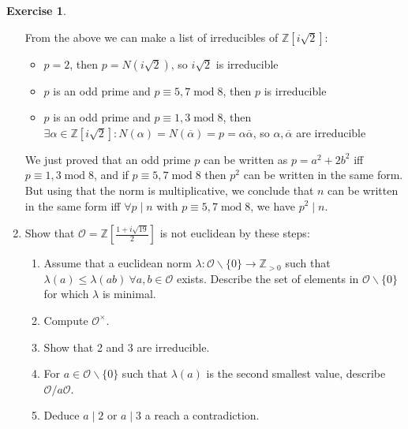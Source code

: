 \documentclass{article}
\newcommand{\Z}{\mathbb{Z}}
\newcommand{\Mod}{\operatorname{mod}}
\newcommand{\ri}{\mathcal{O}}
\theoremstyle{definition}
\newtheorem{exe}[defn]{Exercise}
\begin{document}
\begin{exe}
\begin{enumerate}
From the above we can make a list of irreducibles of $\Z\left[i\sqrt 2\right]$:
\begin{itemize}
\item $p=2$, then $p=N(i\sqrt 2)$, so $i\sqrt 2$ is irreducible
\item $p$ is an odd prime and $p\equiv 5,7\Mod 8$, then $p$ is irreducible
\item $p$ is an odd prime and $p\equiv 1,3\Mod 8$, then $\exists\alpha\in\Z\left[i\sqrt 2\right]:N(\alpha)=N(\overline\alpha)=p=\alpha\overline\alpha$, so $\alpha,\overline\alpha$ are irreducible
\end{itemize}
We just proved that an odd prime $p$ can be written as $p=a^2+2b^2$ iff $p\equiv 1,3\Mod 8$, and if $p\equiv 5,7\Mod 8$ then $p^2$ can be written in the same form. But using that the norm is multiplicative, we conclude that $n$ can be written in the same form iff $\forall p\mid n$ with $p\equiv 5,7\Mod 8$, we have $p^2\mid n$.
\item Show that $\ri=\Z\left[\frac{1+i\sqrt{19}}{2}\right]$ is not euclidean by these steps:
\begin{enumerate}
\item Assume that a euclidean norm $\lambda:\ri\backslash\{0\}\rightarrow\Z_{>0}$ such that $\lambda(a)\leq\lambda(ab) \ \forall a,b\in\ri$ exists. Describe the set of elements in $\ri\backslash\{0\}$ for which $\lambda$ is minimal.
\item Compute $\ri^\times$.
\item Show that 2 and 3 are irreducible.
\item For $a\in\ri\backslash\{0\}$ such that $\lambda(a)$ is the second smallest value, describe $\ri/a\ri$.
\item Deduce $a\mid 2$ or $a\mid 3$ a reach a contradiction.
\end{enumerate}


\end{enumerate}
\end{exe}
\end{document}
